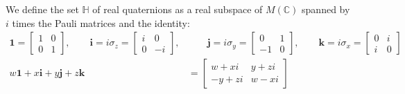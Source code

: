 \documentclass[12pt]{article}
\begin{document}

We define the set $\mathbb H$ of real quaternions as a real subspace of $M(\mathbb C)$ spanned by $i$ times the Pauli matrices and the identity:
\begin{align*}
    \mathbf 1 = \begin{bmatrix}1 & 0 \\ 0 & 1 \end{bmatrix}, \qquad {\mathbf i} = i \sigma_z = \begin{bmatrix}i & 0 \\ 0 & -i\end{bmatrix}, &\qquad {\mathbf j} = i\sigma_y = \begin{bmatrix} 0 & 1 \\ -1 & 0 \end{bmatrix}, \qquad {\mathbf k} = i\sigma_x = \begin{bmatrix}0 & i \\ i & 0 \end{bmatrix} \\
    w\mathbf 1 + x {\mathbf i} + y {\mathbf j} + z {\mathbf k} &= \begin{bmatrix}
       w + x i & y + zi \\ -y + z i & w - xi 
    \end{bmatrix}
\end{align*}
\end{document}
